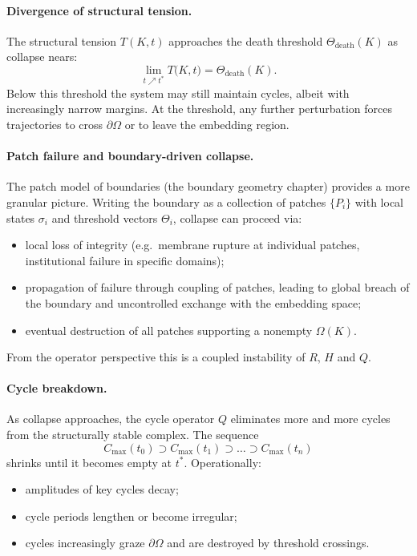 \paragraph{Divergence of structural tension.}
The structural tension \(T(K,t)\) approaches the death threshold
\(\Theta_{\mathrm{death}}(K)\) as collapse nears:
\[
  \lim_{t\nearrow t^{\ast}} T\big(K,t\big)
    = \Theta_{\mathrm{death}}(K).
\]
Below this threshold the system may still maintain cycles, albeit with
increasingly narrow margins. At the threshold, any further perturbation
forces trajectories to cross \(\partial\Omega\) or to leave the embedding
region.

\paragraph{Patch failure and boundary-driven collapse.}
The patch model of boundaries
(the boundary geometry chapter) provides a more granular picture.
Writing the boundary as a collection of patches \(\{P_i\}\) with local states
\(\sigma_i\) and threshold vectors \(\Theta_i\),
collapse can proceed via:
\begin{itemize}
  \item local loss of integrity (e.g.\ membrane rupture at individual
        patches, institutional failure in specific domains);
  \item propagation of failure through coupling of patches, leading to
        global breach of the boundary and uncontrolled exchange with the
        embedding space;
  \item eventual destruction of all patches supporting a nonempty
        \(\Omega(K)\).
\end{itemize}
From the operator perspective this is a coupled instability of \(R\),
\(H\) and \(Q\).

\paragraph{Cycle breakdown.}
As collapse approaches, the cycle operator \(Q\) eliminates more and more
cycles from the structurally stable complex. The sequence
\[
  C_{\max}(t_0)
  \supset C_{\max}(t_1)
  \supset \dots
  \supset C_{\max}(t_n)
\]
shrinks until it becomes empty at \(t^{\ast}\). Operationally:
\begin{itemize}
  \item amplitudes of key cycles decay;
  \item cycle periods lengthen or become irregular;
  \item cycles increasingly graze \(\partial\Omega\) and are destroyed by
        threshold crossings.
\end{itemize}


